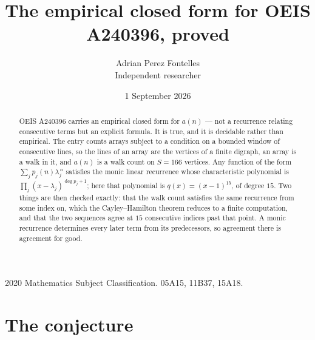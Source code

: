 \documentclass[11pt,a4paper]{article}
\title{The empirical closed form for OEIS A240396, proved}
\author{Adrian Perez Fontelles\\ \small Independent researcher}
\date{1 September 2026}
\theoremstyle{plain}
\theoremstyle{definition}
\begin{document}
\maketitle

\begin{abstract}
OEIS A240396 carries an empirical closed form for $a(n)$ --- not a recurrence relating
consecutive terms but an explicit formula. It is true, and it is decidable rather than
empirical. The entry counts arrays subject to a condition on a bounded window of consecutive lines, so the lines of an array are the
vertices of a finite digraph, an array is a walk in it, and $a(n)$ is a walk count on
$S=166$ vertices. Any function of the form $\sum_j p_j(n)\lambda_j^{\,n}$ satisfies the
monic linear recurrence whose characteristic polynomial is
$\prod_j(x-\lambda_j)^{\deg p_j+1}$; here that polynomial is $q(x)=(x-1)^{15}$, of degree
$15$. Two things are then checked exactly: that the walk count satisfies the same
recurrence from some index on, which the Cayley--Hamilton theorem reduces to a finite
computation, and that the two sequences agree at $15$ consecutive indices past that
point. A monic recurrence determines every later term from its predecessors, so agreement
there is agreement for good.
\end{abstract}

\noindent\small 2020 Mathematics Subject Classification. 05A15, 11B37, 15A18.\normalsize

\section{The conjecture}
\end{document}
